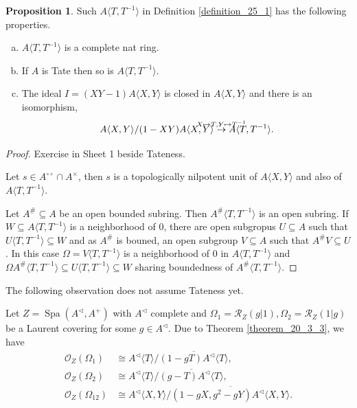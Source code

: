 \documentclass[10pt]{article}
\numberwithin{equation}{section}
\theoremstyle{definition}
\newtheorem{proposition}{Proposition}[subsection]
\DeclareMathOperator{\Spa}{Spa}
\newcommand{\cR}[0]{\mathcal{R}}
\newcommand{\cO}[0]{\mathcal{O}}
\newcommand{\dcirc}[0]{{\circ\circ}}
\begin{document}
\begin{proposition}
    \label{fact_25_1}
    \label{proposition_25_1_fact}
    Such $A\langle T,T^{-1}\rangle$ in Definition \ref{definition_25_1} has the following properties.
    \begin{enumerate}[a. ]
        \item $A\langle T,T^{-1}\rangle$ is a complete nat ring.
        \item If $A$ is Tate then so is $A\langle T,T^{-1}\rangle$.
        \item The ideal $I = (XY-1)A\langle X,Y\rangle$ is closed in $A\langle X,Y\rangle$ and there is an isomorphism,
        \begin{equation*}
            A\langle X,Y\rangle/(1-XY)A\langle X,Y\rangle \stackrel{\mathmakebox[0pt][c]{X\mapsto T,Y\mapsto T^{-1}}}{\to} A\langle T,T^{-1}\rangle.
        \end{equation*}
    \end{enumerate}
\end{proposition}
\begin{proof}
    Exercise in Sheet 1 beside Tateness.
    \par Let $s\in A^\dcirc\cap A^\times$, then $s$ is a topologically nilpotent unit of $A\langle X,Y\rangle$ and also of $A\langle T,T^{-1}\rangle$.
    \par Let $A^\#\subseteq A$ be an open bounded subring. Then $A^\#\langle T,T^{-1}\rangle$ is an open subring. If $W\subseteq A\langle T,T^{-1}\rangle$ is a neighborhood of $0$, 
    there are open subgropus $U\subseteq A$ such that $U\langle T,T^{-1}\rangle\subseteq W$ and as $A^\#$ is bouned, an open subgroup $V\subseteq A$ such that $A^\#V\subseteq U$. 
    In this case $\Omega = V\langle T,T^{-1}\rangle$ is a neighborhood of $0$ in $A\langle T,T^{-1}\rangle$ and $\Omega A^\#\langle T,T^{-1}\rangle\subseteq U\langle T,T^{-1}\rangle\subseteq W$ sharing boundedness of $A^\#\langle T,T^{-1}\rangle$.
\end{proof}

The following observation does not assume Tateness yet. 
\par Let $Z=\Spa(A^\triangleleft,A^+)$ with $A^\triangleleft$ complete and $\Omega_1 = \cR_Z(g|1),\Omega_2= \cR_Z(1|g)$ be a Laurent covering for some $g\in A^\triangleleft$. Due to Theorem \ref{theorem_20_3_3}, we have 
\begin{align*}
    \cO_Z(\Omega_1)&\cong A^\triangleleft\langle T\rangle/\overline{(1-gT)A^\triangleleft\langle T\rangle},\\
    \cO_Z(\Omega_2) &\cong A^\triangleleft\langle T\rangle/\overline{(g-T)A^\triangleleft\langle T\rangle},\\
    \cO_Z(\Omega_{12})&\cong A^\triangleleft\langle X,Y\rangle/\overline{(1-gX,g^2-gY)A^\triangleleft\langle X,Y\rangle}.
\end{align*}
\end{document}
